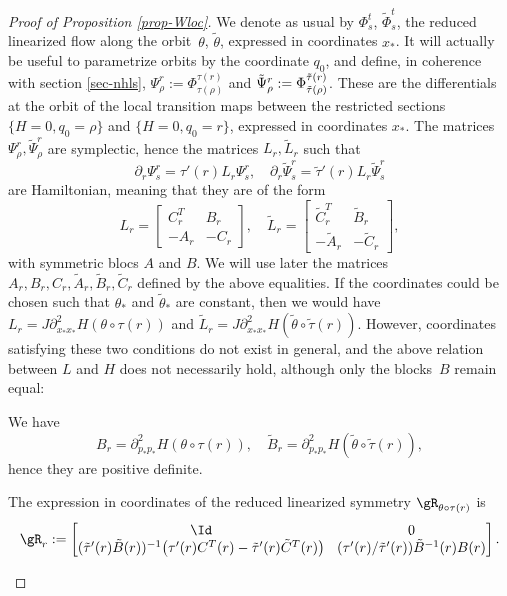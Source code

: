 \begin{proof}[Proof of Proposition \ref{prop-Wloc}]
We denote as usual by $\Phi_s^t$, \resp $\tilde \Phi_s^t$, the reduced linearized flow along the orbit~$\theta$, \resp $\tilde \theta$, expressed in coordinates $x_*$.
It will actually be useful to parametrize orbits by the coordinate $q_0$, and define, in coherence with section \ref{sec-nhls}, $\Psi_{\rho}^r:= \Phi_{\tau(\rho)}^{\tau(r)}$ and
$\tilde \Psi_{\rho}^r:=\nobreak\Phi_{\tilde \tau(\rho)}^{\tilde \tau(r)}$. These are the differentials at the orbit of the local transition maps between the restricted sections $\{H=0, q_0=\rho \}$ and $\{H=0, q_0=r \}$, expressed in coordinates $x_*$.
The matrices $\Psi_{\rho}^r, \tilde \Psi_{\rho}^r$ are symplectic, hence the matrices $L_r, \tilde L_r$ such that
\[
\partial_r \Psi_s^r=\tau'(r)L_r \Psi_s^r, \quad
\partial_r \tilde \Psi_s^r=\tilde \tau'(r)L_r \tilde \Psi_s^r
\]
are Hamiltonian, meaning that they are of the form
\[
L_r=\begin{bmatrix}
C_r^T & B_r\\-A_r &-C _r
\end{bmatrix}
, \quad
\tilde L_r=\begin{bmatrix}
\tilde C_r^T & \tilde B_r\\-\tilde A_r &-\tilde C _r
\end{bmatrix},
\]
with symmetric blocs $A$ and $B$. We will use later the matrices $A_r, B_r, C_r, \tilde A_r, \tilde B_r, \tilde C_r$ defined by the above equalities.
If the coordinates could be chosen such that $\theta_*$ and $\tilde \theta_* $ are constant, then we would have $L_r=J\partial^2_{x_*x_*}H(\theta\circ \tau(r))$ and $\tilde L_r=J\partial^2_{x_*x_*}H(\tilde \theta \circ\tilde \tau(r))$.
However, coordinates satisfying these two conditions do not exist in general, and the above relation between $L$ and $H$ does not necessarily hold,
although only the blocks~$B$ remain equal:

\begin{lem}\label{lem-reduc}
We have
\[
B_r= \partial^2_{p_*p_*}H(\theta\circ \tau(r)), \quad \tilde B_r= \partial^2_{p_*p_*}H(\tilde \theta\circ \tilde \tau(r)),
\]
hence they are positive definite.
\end{lem}

\begin{lem}\label{lem-R}
The expression in coordinates of the reduced linearized symmetry $\gR_{\theta\circ \tau(r)}$ is
\[\arraycolsep4.5pt
\gR_{r}:=
\begin{bmatrix}
\Id&0\\
(\tilde \tau'(r)\tilde B(r))^{-1}\big(\tau'(r)C^T(r)-\tilde \tau'(r) \tilde C^T(r)\big) & (\tau'(r)/\tilde \tau'(r)) \tilde B^{-1}(r) B(r)
\end{bmatrix}.
\]
\end{lem}


\end{proof}
